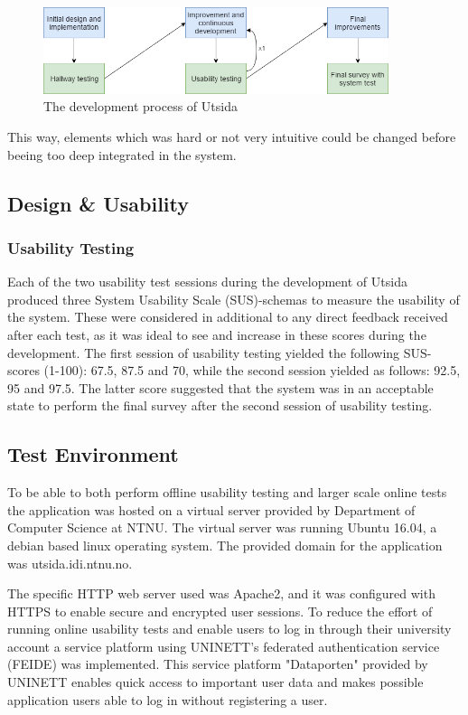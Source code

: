 \begin{figure}[h]
    \centering
    \includegraphics[width=0.9\textwidth]{fig/development_process.png}
    \caption{The development process of Utsida}
    \label{fig:development_process}
\end{figure}

This way, elements which was hard or not very intuitive could be changed before beeing too deep integrated in the system.


\subsection{Design \& Usability}

\subsubsection{Usability Testing}
Each of the two usability test sessions during the development of Utsida produced three System Usability Scale (SUS)-schemas to measure the usability of the system. These were considered in additional to any direct feedback received after each test, as it was ideal to see and increase in these scores during the development. The first session of usability testing yielded the following SUS-scores (1-100): 67.5, 87.5 and 70, while the second session yielded as follows: 92.5, 95 and 97.5. The latter score suggested that the system was in an acceptable state to perform the final survey after the second session of usability testing.

\subsection{Test Environment}
To be able to both perform offline usability testing and larger scale online tests the application was hosted on a virtual server provided by Department of Computer Science at NTNU. The virtual server was running Ubuntu 16.04, a debian based linux operating system. The provided domain for the application was utsida.idi.ntnu.no.  

The specific HTTP web server used was Apache2, and it was configured with HTTPS to enable secure and encrypted user sessions. To reduce the effort of running online usability tests and enable users to log in through their university account a service platform using UNINETT's federated authentication service (FEIDE) was implemented. This service platform "Dataporten" provided by UNINETT enables quick access to important user data and makes possible application users able to log in without registering a user. 


